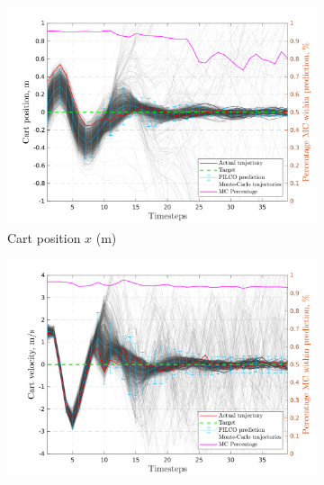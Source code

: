 




\begin{figure}[htbp]    
   \begin{subfigure}[b]{1\linewidth}
    \centering
    \includegraphics[height=0.4\textheight,width=1\textwidth]{Chapter3/Figures/cp_MC_rollout_Ep_15_Dim_1.png} 
    \caption{Cart position $x$ (m)} 
    \label{Fig:Re-cp-cart-position} 
  \end{subfigure} 
  \begin{subfigure}[b]{1\linewidth}
    \centering
    \includegraphics[height=0.4\textheight,width=1\textwidth]{Chapter3/Figures/cp_MC_rollout_Ep_15_Dim_2.png} 

\end{subfigure}
\end{figure}

